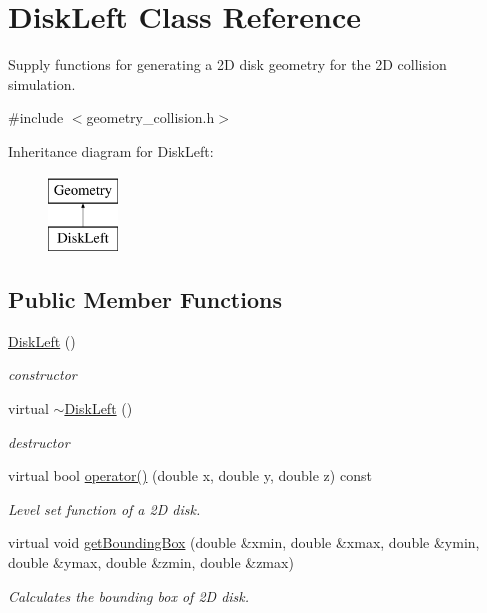 \hypertarget{classDiskLeft}{\section{Disk\-Left Class Reference}
\label{classDiskLeft}
}


Supply functions for generating a 2\-D disk geometry for the 2\-D collision simulation.  




{\ttfamily \#include $<$geometry\-\_\-collision.\-h$>$}

Inheritance diagram for Disk\-Left\-:\begin{figure}[H]
\begin{center}
\leavevmode
\includegraphics[height=2.000000cm]{classDiskLeft}
\end{center}
\end{figure}
\subsection*{Public Member Functions}
\begin{DoxyCompactItemize}
\item 
\hypertarget{classDiskLeft_a61d761f6c1adce3f6ed71d384d105425}{\hyperlink{classDiskLeft_a61d761f6c1adce3f6ed71d384d105425}{Disk\-Left} ()}\label{classDiskLeft_a61d761f6c1adce3f6ed71d384d105425}

\begin{DoxyCompactList}\small\item\em constructor \end{DoxyCompactList}\item 
\hypertarget{classDiskLeft_a71a93d69543f8863ae4db94d855e7ea0}{virtual \hyperlink{classDiskLeft_a71a93d69543f8863ae4db94d855e7ea0}{$\sim$\-Disk\-Left} ()}\label{classDiskLeft_a71a93d69543f8863ae4db94d855e7ea0}

\begin{DoxyCompactList}\small\item\em destructor \end{DoxyCompactList}\item 
virtual bool \hyperlink{classDiskLeft_a6bf1a04ca462be0549370b1e06efac6e}{operator()} (double x, double y, double z) const 
\begin{DoxyCompactList}\small\item\em Level set function of a 2\-D disk. \end{DoxyCompactList}\item 
virtual void \hyperlink{classDiskLeft_a0aaa749c5b91d783a1fb65b5fc09ff1e}{get\-Bounding\-Box} (double \&xmin, double \&xmax, double \&ymin, double \&ymax, double \&zmin, double \&zmax)
\begin{DoxyCompactList}\small\item\em Calculates the bounding box of 2\-D disk. \end{DoxyCompactList}\end{DoxyCompactItemize}


